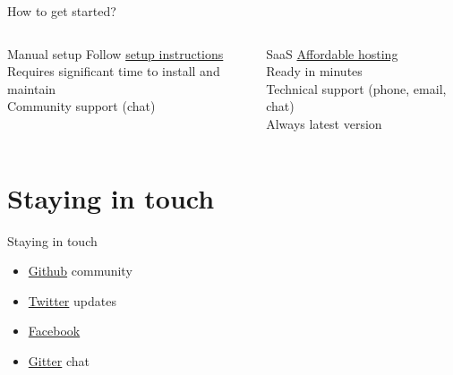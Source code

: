\documentclass{beamer}
\begin{document}
\begin{frame}{How to get started?}
    \begin{columns}[T]
        \begin{column}{.45\textwidth}
            \begin{block}{Manual setup}
            Follow \href{https://github.com/reconmap/reconmap\#readme}{setup instructions}\\
			\bigskip
            Requires significant time to install and maintain\\
            Community support (chat)
            \end{block}
        \end{column}
        \begin{column}{.45\textwidth}
            \begin{block}{SaaS}
            \href{https://reconmap.com}{Affordable hosting}\\
            \bigskip
            Ready in minutes\\
            Technical support (phone, email, chat)\\
            Always latest version            
            \end{block}
        \end{column}
    \end{columns}
    
\end{frame}

\section{Staying in touch}

\begin{frame}{Staying in touch}
    \begin{itemize}
        \item \href{https://github.com/reconmap}{Github} community
        \item \href{https://twitter.com/reconmap}{Twitter} updates
        \item \href{https://facebook.com/reconmap}{Facebook}
        \item \href{https://gitter.im/reconmap/community}{Gitter} chat
    \end{itemize}
\end{frame}
\end{document}
